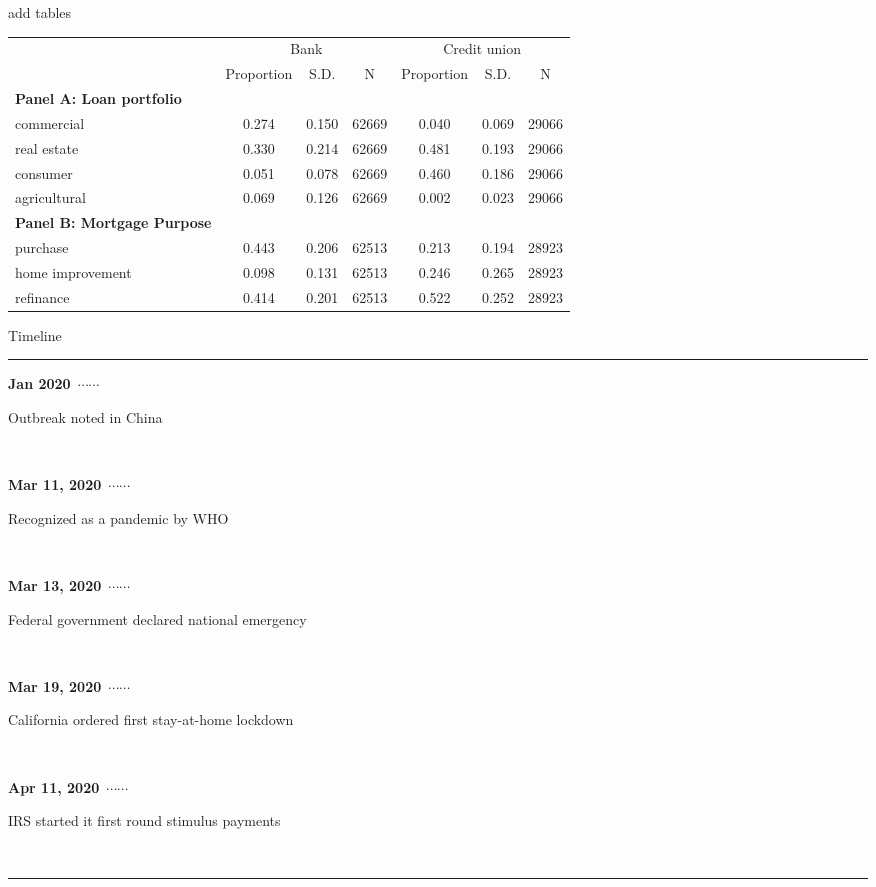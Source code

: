 \documentclass[notes,11pt, aspectratio=169]{beamer}
\newcommand\ytl[2]{
	\parbox[b]{11em}{\hfill{\color{cyan}\bfseries\sffamily #1}~$\cdots\cdots$~}\makebox[0pt][c]{$\bullet$}\vrule\quad \parbox[c]{6cm}{\vspace{8pt}\color{red!40!black!80}\raggedright\sffamily #2 \\[7pt]}\\[-3pt]}
\begin{document}
\begin{frame}{add tables}
\begin{table}
\centering
\begin{adjustbox}{max width=0.8\textwidth}
\begin{tabular}{l*{6}{c}}
\toprule
&\multicolumn{3}{c}{Bank}&\multicolumn{3}{c}{Credit union}\\
\cmidrule(lr){2-4}\cmidrule(lr){5-7}
&\multicolumn{1}{c}{Proportion}&\multicolumn{1}{c}{S.D.}&\multicolumn{1}{c}{N}&\multicolumn{1}{c}{Proportion}&\multicolumn{1}{c}{S.D.}&\multicolumn{1}{c}{N} \\
\midrule
  \textbf{Panel A: Loan portfolio} & & & & & & \\
  commercial&       0.274&       0.150&       62669&       0.040&       0.069&       29066\\
  real estate&       0.330&       0.214&       62669&       0.481&       0.193&       29066\\
  consumer&       0.051&       0.078&       62669&       0.460&       0.186&       29066\\
  agricultural&       0.069&       0.126&       62669&       0.002&       0.023&       29066\\
  \midrule
  \textbf{Panel B: Mortgage Purpose} & & & & & & \\
  purchase  &       0.443&       0.206&       62513&       0.213&       0.194&       28923\\
  home improvement &       0.098&       0.131&       62513&       0.246&       0.265&       28923\\
  refinance      &       0.414&       0.201&       62513&       0.522&       0.252&       28923\\
  \bottomrule
\end{tabular}
\end{adjustbox}
\end{table}
\end{frame}


\begin{frame}{Timeline}
\begin{table}
\centering
\begin{minipage}[t]{.9\linewidth}
	\color{gray}
	\rule{\linewidth}{1pt}
	 \ytl{Jan 2020}{Outbreak noted in China}
	 \ytl{Mar 11, 2020}{Recognized as a pandemic by WHO}
	 \ytl{Mar 13, 2020}{Federal government declared national emergency}
	 \ytl{Mar 19, 2020}{California ordered first stay-at-home lockdown}
	 \ytl{Apr 11, 2020}{IRS started it first round stimulus payments}
	\rule{\linewidth}{1pt}%
\end{minipage}%
\end{table}
\end{frame}
\end{document}
